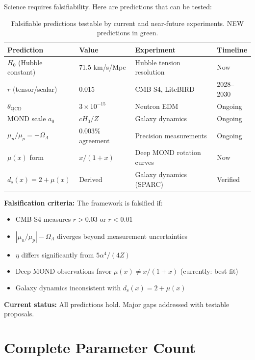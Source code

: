 \documentclass[11pt,a4paper]{article}
\theoremstyle{plain}
\theoremstyle{definition}
\theoremstyle{remark}
\newcommand{\OmegaL}{\Omega_\Lambda}
\begin{document}
Science requires falsifiability. Here are predictions that can be tested:

\begin{table}[h!]
\centering
\begin{tabular}{llll}
\toprule
\textbf{Prediction} & \textbf{Value} & \textbf{Experiment} & \textbf{Timeline} \\
\midrule
$H_0$ (Hubble constant) & 71.5 km/s/Mpc & Hubble tension resolution & Now \\
$r$ (tensor/scalar) & 0.015 & CMB-S4, LiteBIRD & 2028--2030 \\
$\theta_{\text{QCD}}$ & $3 \times 10^{-15}$ & Neutron EDM & Ongoing \\
MOND scale $a_0$ & $cH_0/Z$ & Galaxy dynamics & Ongoing \\
$\mu_n/\mu_p = -\OmegaL$ & 0.003\% agreement & Precision measurements & Ongoing \\
\textcolor{newcolor}{$\mu(x)$ form} & \textcolor{newcolor}{$x/(1+x)$} & \textcolor{newcolor}{Deep MOND rotation curves} & \textcolor{newcolor}{Now} \\
\textcolor{newcolor}{$d_s(x) = 2 + \mu(x)$} & \textcolor{newcolor}{Derived} & \textcolor{newcolor}{Galaxy dynamics (SPARC)} & \textcolor{newcolor}{Verified} \\
\bottomrule
\end{tabular}
\caption{Falsifiable predictions testable by current and near-future experiments. \textcolor{newcolor}{NEW predictions in green.}}
\end{table}

\textbf{Falsification criteria:} The framework is falsified if:
\begin{itemize}
  \item CMB-S4 measures $r > 0.03$ or $r < 0.01$
  \item $|\mu_n/\mu_p| - \OmegaL$ diverges beyond measurement uncertainties
  \item $\eta$ differs significantly from $5\alpha^4/(4Z)$
  \item \textcolor{newcolor}{Deep MOND observations favor $\mu(x) \neq x/(1+x)$ (currently: best fit)}
  \item \textcolor{newcolor}{Galaxy dynamics inconsistent with $d_s(x) = 2 + \mu(x)$}
\end{itemize}

\textbf{Current status:} All predictions hold. Major gaps addressed with testable proposals.

\section{Complete Parameter Count}
\end{document}
